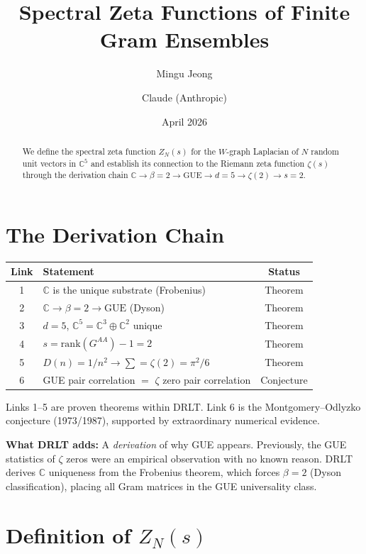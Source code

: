 \documentclass[11pt]{article}
\title{Spectral Zeta Functions of Finite Gram Ensembles}
\author{Mingu Jeong \and Claude (Anthropic)}
\date{April 2026}
\begin{document}
\maketitle

\begin{abstract}
We define the spectral zeta function $Z_N(s)$ for the
$W$-graph Laplacian of $N$ random unit vectors in $\mathbb{C}^5$
and establish its connection to the Riemann zeta function $\zeta(s)$
through the derivation chain
$\mathbb{C} \to \beta=2 \to \mathrm{GUE} \to d=5 \to \zeta(2) \to s=2$.
\end{abstract}

\section{The Derivation Chain}

\begin{center}
\renewcommand{\arraystretch}{1.3}
\begin{tabular}{clc}
\hline
\textbf{Link} & \textbf{Statement} & \textbf{Status} \\
\hline
1 & $\mathbb{C}$ is the unique substrate (Frobenius) & Theorem \\
2 & $\mathbb{C} \to \beta = 2 \to \mathrm{GUE}$ (Dyson) & Theorem \\
3 & $d = 5$, $\mathbb{C}^5 = \mathbb{C}^3 \oplus \mathbb{C}^2$ unique & Theorem \\
4 & $s = \mathrm{rank}(G^{AA}) - 1 = 2$ & Theorem \\
5 & $D(n) = 1/n^2 \to \sum = \zeta(2) = \pi^2/6$ & Theorem \\
6 & GUE pair correlation $=$ $\zeta$ zero pair correlation & Conjecture \\
\hline
\end{tabular}
\end{center}

Links 1--5 are proven theorems within DRLT.
Link 6 is the Montgomery--Odlyzko conjecture (1973/1987),
supported by extraordinary numerical evidence.

\textbf{What DRLT adds:} A \emph{derivation} of why GUE appears.
Previously, the GUE statistics of $\zeta$ zeros were an empirical
observation with no known reason.  DRLT derives $\mathbb{C}$ uniqueness
from the Frobenius theorem, which forces $\beta = 2$ (Dyson classification),
placing all Gram matrices in the GUE universality class.

\section{Definition of $Z_N(s)$}
\end{document}
